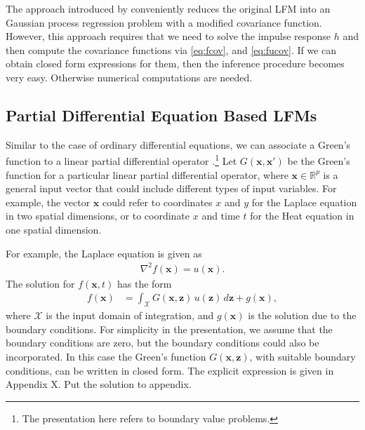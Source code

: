 \documentclass[journal]{IEEEtran}
\newcommand{\simo}[1]{{\color{red}#1}}
\begin{document}
The approach introduced by
\cite{Alvarez+Lawrence:2009,Alvarez+Luengo+Lawrence:2013} conveniently
reduces the original LFM into an Gaussian process regression problem
with a modified covariance function. However, this approach requires
that we need to solve the impulse response $h$ and then compute the
covariance functions via \eqref{eq:fcov}, and \eqref{eq:fucov}.  If we can obtain closed form
expressions for them, then the inference procedure becomes very
easy. Otherwise numerical computations are needed.


\subsection{Partial Differential Equation Based LFMs}
%
Similar to the case of ordinary differential equations, we can associate a Green's function to a linear partial differential
operator \cite{Myintu:LPDEBook:2006, Polyanin:Handbook02}.\footnote{The presentation here refers to boundary value
problems.}
Let $G(\mathbf{x}, \mathbf{x}')$ be the Green's function for a
particular linear partial differential operator, where $\mathbf{x}\in\mathbb{R}^p$ is a general input vector that could
include different types of input variables. For example, the vector $\mathbf{x}$ could refer to
coordinates $x$ and $y$ for the Laplace equation in two spatial dimensions, or to coordinate $x$ and time
$t$ for the Heat equation in one spatial dimension.

For example, the Laplace equation is given as
\begin{align*}
  \nabla^2 f(\mathbf{x}) = u(\mathbf{x}).
\end{align*}
%
The solution for $f(\mathbf{x},t)$ has the form
\begin{align*}
f(\mathbf{x}) & = \int_{\mathcal{X}} G(\mathbf{x}, \mathbf{z})\,
                u(\mathbf{z})\,d\mathbf{z} + g(\mathbf{x}),
\end{align*}
%
where $\mathcal{X}$ is the input domain of integration, and $g(\mathbf{x})$ is the solution due to the boundary
conditions. For simplicity in the presentation, we assume that the boundary conditions are zero, but the boundary conditions could also be incorporated. In this case the Green's function $G(\mathbf{x}, \mathbf{z})$, with suitable boundary conditions, can be written in closed form. The explicit expression is given in Appendix X. \simo{Put the solution to appendix}.
\end{document}
